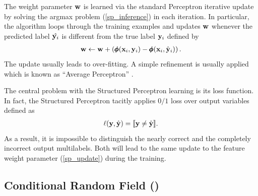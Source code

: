 {The weight parameter $\mathbf {w}$ is learned via the standard Perceptron iterative update by solving the argmax problem (\ref{sp_inference}) in each iteration.
In particular, the algorithm loops through the training examples and updates $\mathbf {w}$ whenever the predicted label $\hat{\mathbf {y}_i}$ is different from the true label $\mathbf {y}_i$ defined by
\begin{align}
	\mathbf {w} \leftarrow \mathbf {w} + \left(\pmb \phi(\mathbf {x}_i,\mathbf {y}_i) - \pmb \phi(\mathbf {x}_i,\hat{\mathbf {y}}_i)\right). \label{sp_update}
\end{align}
The update usually leads to over-fitting.
A simple refinement is usually applied which is known as ``Average Perceptron'' \citep{Freund99large}.

The central problem with the Structured Perceptron learning is its loss function.
In fact, the Structured Perceptron tacitly applies $0/1$ loss over output variables defined as
\begin{align*}
	\mathbf {\ell}(\mathbf {y},\hat{\mathbf {y}})={\llbracket \mathbf {y}\neq\hat{\mathbf {y}} \rrbracket}.
\end{align*}
As a result, it is impossible to distinguish the nearly correct and the completely incorrect output multilabels.
Both will lead to the same update to the feature weight parameter (\ref{sp_update}) during the training.


%
% 
\subsection{Conditional Random Field (\crf)} \label{sc_crf}

}
